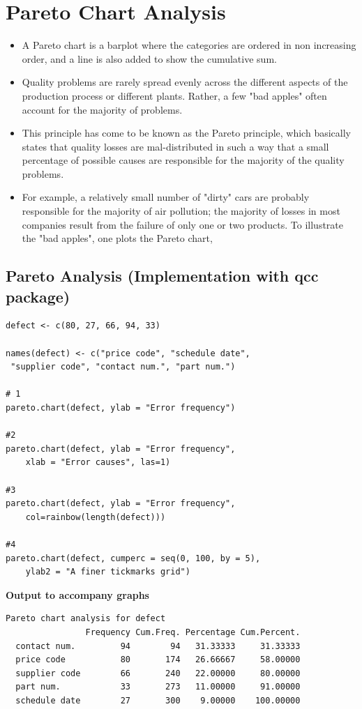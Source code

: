 \documentclass[SPC-MASTER.tex]{subfiles}
\begin{document}
	\section{Pareto Chart Analysis}
{
\Large 
\begin{itemize}
\item A Pareto chart is a barplot where the categories are ordered in non increasing order, and a line is also added to show the cumulative sum.
\item Quality problems are rarely spread evenly across the different aspects of the production process or different plants. Rather, a few "bad apples" often account for the majority of problems. 
\item This principle has come to be known as the Pareto principle, which basically states that quality losses are mal-distributed in such a way that a small percentage of possible causes are responsible for the majority of the quality problems. 
\item For example, a relatively small number of "dirty" cars are probably responsible for the majority of air pollution; the majority of losses in most companies result from the failure of only one or two products. To illustrate the "bad apples", one plots the Pareto chart,
\end{itemize}
}
\newpage
\subsection{Pareto Analysis (Implementation with qcc package)}
\begin{framed}
\begin{verbatim}
defect <- c(80, 27, 66, 94, 33)

names(defect) <- c("price code", "schedule date", 
 "supplier code", "contact num.", "part num.")

# 1
pareto.chart(defect, ylab = "Error frequency")

#2
pareto.chart(defect, ylab = "Error frequency", 
    xlab = "Error causes", las=1)

#3
pareto.chart(defect, ylab = "Error frequency", 
    col=rainbow(length(defect)))

#4
pareto.chart(defect, cumperc = seq(0, 100, by = 5), 
    ylab2 = "A finer tickmarks grid")

\end{verbatim}
\end{framed}
\newpage
\textbf{Output to accompany graphs}
\begin{framed}
\begin{verbatim}
Pareto chart analysis for defect
                Frequency Cum.Freq. Percentage Cum.Percent.
  contact num.         94        94   31.33333     31.33333
  price code           80       174   26.66667     58.00000
  supplier code        66       240   22.00000     80.00000
  part num.            33       273   11.00000     91.00000
  schedule date        27       300    9.00000    100.00000
\end{verbatim}
\end{framed}
\newpage
\end{document}
